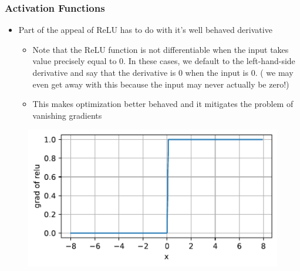 \documentclass[
  shownotes,
  xcolor={svgnames},
  hyperref={colorlinks,citecolor=DarkBlue,linkcolor=DarkRed,urlcolor=DarkBlue}
  , aspectratio=169]{beamer}
\begin{document}
\begin{frame}
\frametitle{Activation Functions}
\begin{itemize}
    \item Part of the appeal of ReLU has to do with it's well behaved derivative
    \begin{itemize}
        \item  Note that the ReLU function is not differentiable when the input takes value precisely equal to 0. In these cases, we default to the left-hand-side derivative and say that the derivative is 0 when the input is 0. ( we may even get away with this because the input may never actually be zero!)
        \item This makes optimization better behaved and it mitigates the problem of vanishing gradients
    \end{itemize}
    
\end{itemize}



  \begin{figure}[H] \centering
            \captionsetup{justification=centering}
              \includegraphics[scale=0.45]{figures/relu_dev}
              
 \end{figure}


\end{frame}
\end{document}
